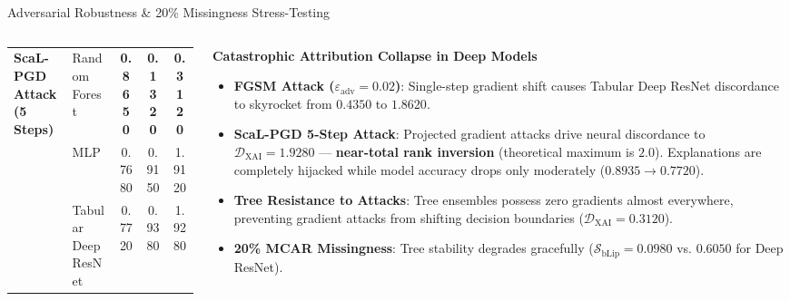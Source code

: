 \documentclass[aspectratio=169,10pt]{beamer}
\begin{document}
\begin{frame}{Adversarial Robustness \& 20\% Missingness Stress-Testing}
\begin{columns}[t]
\begin{column}{0.54\textwidth}
\begin{table}[h]
\begin{tabular}{llccc}
          \midrule
          \multirow{3}{*}{\textbf{ScaL-PGD Attack (5 Steps)}} 
          & Random Forest & \textbf{0.8650} & \textbf{0.1320} & \textbf{0.3120} \\
          & MLP & 0.7680 & 0.9150 & 1.9120 \\
          & Tabular Deep ResNet & 0.7720 & 0.9380 & 1.9280 \\
          \bottomrule
        \end{tabular}
      \end{table}
    \end{column}
    \begin{column}{0.45\textwidth}
      \begin{alertblock}{\textbf{Catastrophic Attribution Collapse in Deep Models}}
        \tiny
        \begin{itemize}\setlength\itemsep{2.5pt}
          \item \textbf{FGSM Attack ($\varepsilon_{\text{adv}} = 0.02$)}:
          Single-step gradient shift causes Tabular Deep ResNet discordance to skyrocket from $0.4350$ to $1.8620$.
          \item \textbf{ScaL-PGD 5-Step Attack}:
          Projected gradient attacks drive neural discordance to $\mathcal{D}_{\text{XAI}} = \mathbf{1.9280}$ --- \textbf{near-total rank inversion} (theoretical maximum is $2.0$). Explanations are completely hijacked while model accuracy drops only moderately ($0.8935 \to 0.7720$).
          \item \textbf{Tree Resistance to Attacks}:
          Tree ensembles possess zero gradients almost everywhere, preventing gradient attacks from shifting decision boundaries ($\mathcal{D}_{\text{XAI}} = 0.3120$).
          \item \textbf{20\% MCAR Missingness}:
          Tree stability degrades gracefully ($\mathcal{S}_{\text{bLip}} = 0.0980$ vs. $0.6050$ for Deep ResNet).
        \end{itemize}
      \end{alertblock}
    \end{column}
  \end{columns}
\end{frame}
\end{document}

